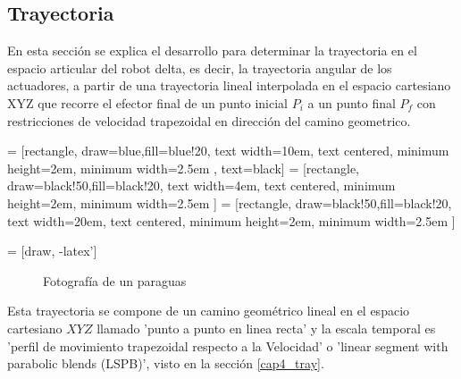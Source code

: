     \newpage

    \subsection{Trayectoria}
    
    En esta sección se explica el desarrollo para determinar la trayectoria en el espacio articular del robot delta, es decir, la trayectoria angular de los actuadores, a partir de una trayectoria lineal interpolada en el espacio cartesiano XYZ que recorre el efector final de un punto inicial $P_i$ a un punto final $P_f$ con restricciones de velocidad trapezoidal en dirección del camino geometrico.

         = [rectangle, draw=blue,fill=blue!20, text width=10em, text centered, minimum height=2em, minimum width=2.5em , text=black]
         = [rectangle, draw=black!50,fill=black!20, text width=4em, text centered, minimum height=2em, minimum width=2.5em ]
         = [rectangle, draw=black!50,fill=black!20, text width=20em, text centered, minimum height=2em, minimum width=2.5em ]

         = [draw, -latex']
         \begin{center}
         \begin{figure}[htb]
                \caption{Fotografía de un paraguas}
                \label{f:cap6_trayectory_1}
         \end{figure}
         \end{center}
         
        \vspace{-1cm}   

        
    Esta trayectoria se compone de un camino geométrico lineal en el espacio cartesiano $XYZ$ llamado 'punto a punto en linea recta' y la escala temporal es 'perfil de movimiento trapezoidal respecto a la Velocidad' o 'linear segment with parabolic blends (LSPB)', visto en la sección \ref{cap4_tray}. 
    
